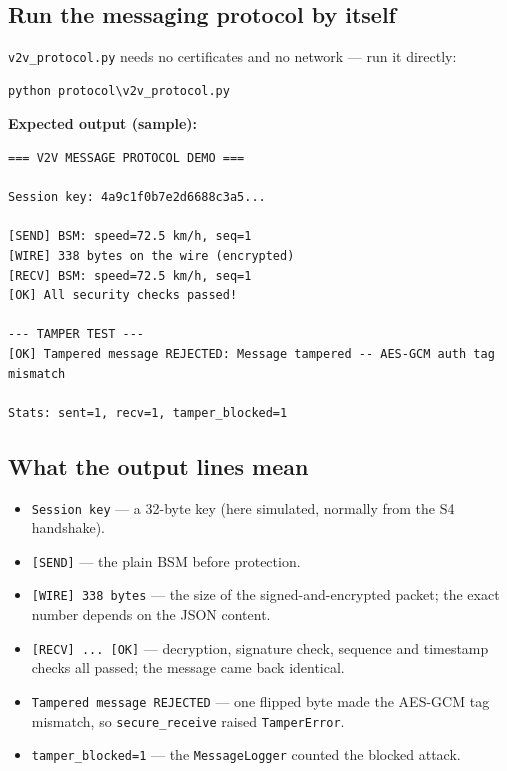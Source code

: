 \documentclass[11pt,a4paper]{report}
\begin{document}
\subsection{Run the messaging protocol by itself}
\texttt{v2v\_protocol.py} needs no certificates and no network --- run it directly:
\begin{lstlisting}[style=term]
python protocol\v2v_protocol.py
\end{lstlisting}

\noindent\textbf{Expected output (sample):}
\begin{lstlisting}[style=term]
=== V2V MESSAGE PROTOCOL DEMO ===

Session key: 4a9c1f0b7e2d6688c3a5...

[SEND] BSM: speed=72.5 km/h, seq=1
[WIRE] 338 bytes on the wire (encrypted)
[RECV] BSM: speed=72.5 km/h, seq=1
[OK] All security checks passed!

--- TAMPER TEST ---
[OK] Tampered message REJECTED: Message tampered -- AES-GCM auth tag mismatch

Stats: sent=1, recv=1, tamper_blocked=1
\end{lstlisting}

\subsection{What the output lines mean}
\begin{itemize}
  \item \texttt{Session key} --- a 32-byte key (here simulated, normally from the
        S4 handshake).
  \item \texttt{[SEND]} --- the plain BSM before protection.
  \item \texttt{[WIRE] 338 bytes} --- the size of the signed-and-encrypted
        packet; the exact number depends on the JSON content.
  \item \texttt{[RECV] ... [OK]} --- decryption, signature check, sequence and
        timestamp checks all passed; the message came back identical.
  \item \texttt{Tampered message REJECTED} --- one flipped byte made the AES-GCM
        tag mismatch, so \texttt{secure\_receive} raised \texttt{TamperError}.
  \item \texttt{tamper\_blocked=1} --- the \texttt{MessageLogger} counted the
        blocked attack.
\end{itemize}
\end{document}
